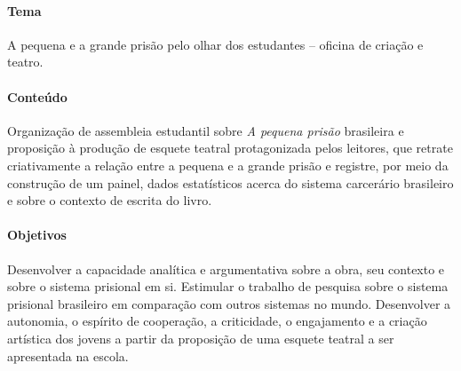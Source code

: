 \documentclass[11pt]{extarticle}
\begin{document}
\paragraph{Tema} A pequena e a grande prisão pelo olhar dos estudantes
-- oficina de criação e teatro.

\paragraph{Conteúdo} Organização de assembleia estudantil sobre \emph{A
pequena prisão} brasileira e proposição à produção de esquete teatral
protagonizada pelos leitores, que retrate criativamente a relação entre
a pequena e a grande prisão e registre, por meio da construção de um
painel, dados estatísticos acerca do sistema carcerário brasileiro e
sobre o contexto de escrita do livro.

\paragraph{Objetivos} Desenvolver a capacidade analítica e argumentativa
sobre a obra, seu contexto e sobre o sistema prisional em si. Estimular
o trabalho de pesquisa sobre o sistema prisional brasileiro em
comparação com outros sistemas no mundo. Desenvolver a autonomia, o
espírito de cooperação, a criticidade, o engajamento e a criação
artística dos jovens a partir da proposição de uma esquete teatral a ser
apresentada na escola.
\end{document}
